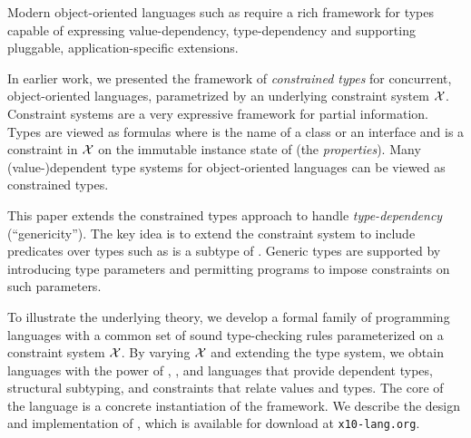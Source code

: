 Modern object-oriented languages such as \Xten require a rich framework
for types capable of expressing value-dependency, type-dependency
and supporting pluggable, application-specific extensions.

In earlier work, we presented the framework of \emph{constrained
types} for concurrent, object-oriented languages, parametrized by
an underlying constraint system $\cal X$. Constraint systems are a
very expressive framework for partial information. Types are viewed
as formulas  where  is the name of a class
or an interface and  is a constraint in $\cal X$ on the
immutable instance state of  (the \emph{properties}).
Many (value-)dependent type systems for object-oriented languages
can be viewed as constrained types.

This paper extends the constrained types approach to handle
\emph{type-dependency} (``genericity''). The key idea is to extend
the constraint system to include predicates over types such as
 is a subtype of .  Generic types are supported
by introducing type parameters and permitting programs to impose
constraints on such parameters.

To illustrate the underlying theory, we develop a formal family of
programming languages with a common set of sound type-checking rules
parameterized on a constraint system $\cal X$.  By varying $\cal X$
and extending the type system, we obtain languages with the power
of \FJ, \FGJ, and languages that provide dependent types, structural
subtyping, and constraints that relate values and types.  The core
of the \Xten language is a concrete instantiation of the framework.  We
describe the design and implementation of \Xten, which is available
for download at \texttt{x10-lang.org}.

